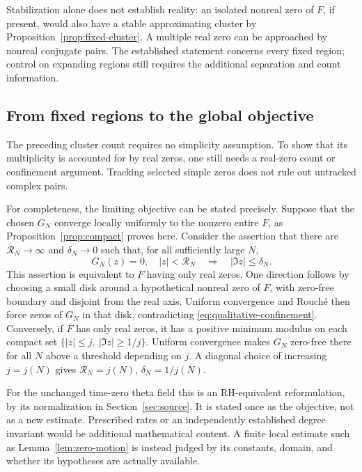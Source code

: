 Stabilization alone does not establish reality: an isolated nonreal
zero of \(F\), if present, would also have a stable approximating
cluster by Proposition~\ref{prop:fixed-cluster}. A multiple real
zero can be approached by nonreal conjugate pairs. The established
statement concerns every fixed region; control on expanding regions
still requires the additional separation and count information.



\subsection{From fixed regions to the global objective}

The preceding cluster count requires no simplicity assumption.
To show that its multiplicity is accounted for by real zeros,
one still needs a real-zero count or confinement argument.
Tracking selected simple zeros does not rule out untracked complex pairs.

For completeness, the limiting objective can be stated precisely.
Suppose that the chosen \(G_N\) converge locally uniformly to the
nonzero entire \(F\), as Proposition~\ref{prop:compact} proves here.
Consider the assertion that there are
\(\mathcal R_N\to\infty\) and \(\delta_N\to0\) such that, for all
sufficiently large \(N\),
\begin{equation}
 G_N(z)=0,\quad |z|<\mathcal R_N
       \quad\Longrightarrow\quad |\Im z|\le\delta_N.
 \label{eq:qualitative-confinement}
\end{equation}
This assertion is equivalent to \(F\) having only real zeros.
One direction follows by choosing a small disk around a hypothetical
nonreal zero of \(F\), with zero-free boundary and disjoint from the
real axis. Uniform convergence and Rouch\'e then force zeros of
\(G_N\) in that disk, contradicting
\eqref{eq:qualitative-confinement}. Conversely, if \(F\) has only
real zeros, it has a positive minimum modulus on each compact set
\(\{|z|\le j,\ |\Im z|\ge1/j\}\). Uniform convergence makes \(G_N\)
zero-free there for all \(N\) above a threshold depending on \(j\).
A diagonal choice of increasing \(j=j(N)\) gives
\(\mathcal R_N=j(N)\), \(\delta_N=1/j(N)\).

For the unchanged time-zero theta field this is an RH-equivalent
reformulation, by its normalization in Section~\ref{sec:source}.
It is stated once as the objective, not as a new estimate. Prescribed
rates or an independently established degree invariant would be
additional mathematical content. A finite local estimate such as
Lemma~\ref{lem:zero-motion} is instead judged by its constants, domain,
and whether its hypotheses are actually available.
